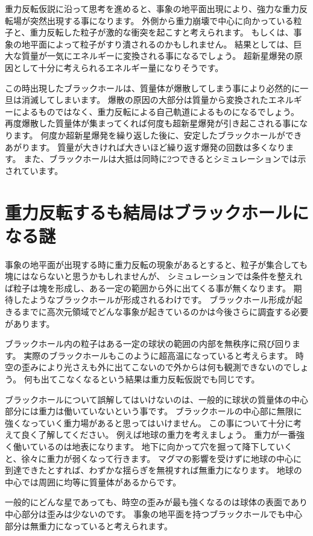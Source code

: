 \documentclass[a4paper,12pt,notitlepage]{jsreport}
\begin{document}
重力反転仮説に沿って思考を進めると、事象の地平面出現により、強力な重力反転場が突然出現する事になります。
外側から重力崩壊で中心に向かっている粒子と、重力反転した粒子が激的な衝突を起こすと考えられます。
もしくは、事象の地平面によって粒子がすり潰されるのかもしれません。
結果としては、巨大な質量が一気にエネルギーに変換される事になるでしょう。
超新星爆発の原因として十分に考えられるエネルギー量になりそうです。

この時出現したブラックホールは、質量体が爆散してしまう事により必然的に一旦は消滅してしまいます。
爆散の原因の大部分は質量から変換されたエネルギーによるものではなく、重力反転による自己軌道によるものになるでしょう。
再度爆散した質量体が集まってくれば何度も超新星爆発が引き起こされる事になります。
何度か超新星爆発を繰り返した後に、安定したブラックホールができあがります。
質量が大きければ大きいほど繰り返す爆発の回数は多くなります。
また、ブラックホールは大抵は同時に2つできるとシミュレーションでは示されています。

\section{重力反転するも結局はブラックホールになる謎}

事象の地平面が出現する時に重力反転の現象があるとすると、粒子が集合しても塊にはならないと思うかもしれませんが、
シミュレーションでは条件を整えれば粒子は塊を形成し、ある一定の範囲から外に出てくる事が無くなります。
期待したようなブラックホールが形成されるわけです。
ブラックホール形成が起きるまでに高次元領域でどんな事象が起きているのかは今後さらに調査する必要があります。

ブラックホール内の粒子はある一定の球状の範囲の内部を無秩序に飛び回ります。
実際のブラックホールもこのように超高温になっていると考えらます。
時空の歪みにより光さえも外に出てこないので外からは何も観測できないのでしょう。
何も出てこなくなるという結果は重力反転仮説でも同じです。

ブラックホールについて誤解してはいけないのは、一般的に球状の質量体の中心部分には重力は働いていないという事です。
ブラックホールの中心部に無限に強くなっていく重力場があると思ってはいけません。
この事について十分に考えて良く了解してください。
例えば地球の重力を考えましょう。
重力が一番強く働いているのは地表になります。
地下に向かって穴を掘って降下していくと、徐々に重力が弱くなって行きます。
マグマの影響を受けずに地球の中心に到達できたとすれば、わずかな揺らぎを無視すれば無重力になります。
地球の中心では周囲に均等に質量体があるからです。

一般的にどんな星であっても、時空の歪みが最も強くなるのは球体の表面であり中心部分は歪みは少ないのです。
事象の地平面を持つブラックホールでも中心部分は無重力になっていると考えられます。
\end{document}
